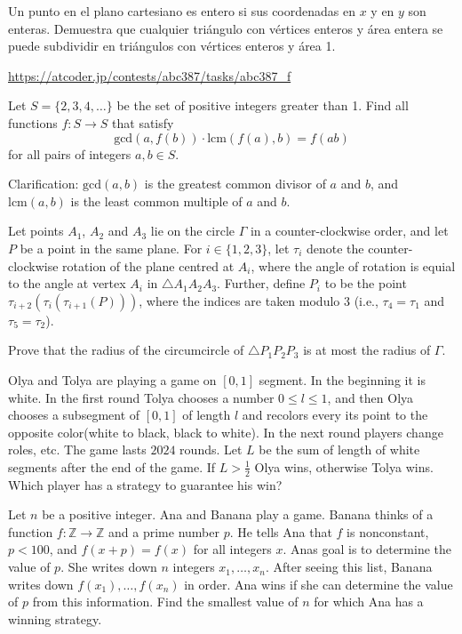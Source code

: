 \documentclass[11pt]{scrartcl}
\begin{document}
\begin{problem}
Un punto en el plano cartesiano es entero si sus coordenadas en $x$ y en $y$ son enteras. Demuestra que
cualquier tri\'angulo con v\'ertices enteros y \'area entera se puede subdividir en tri\'angulos con v\'ertices enteros y \'area 1.

\end{problem}
\begin{problem}[AC ABC387F]
\url{https://atcoder.jp/contests/abc387/tasks/abc387_f}
\end{problem}
\begin{problem}[Rioplatense 2024/3.5]
    Let $S = \{2, 3, 4, \dots\}$ be the set of positive integers greater than 1. Find all functions $f : S \to S$ that satisfy
\[
\text{gcd}(a, f(b)) \cdot \text{lcm}(f(a), b) = f(ab)
\]for all pairs of integers $a, b \in S$.

Clarification: $\text{gcd}(a,b)$ is the greatest common divisor of $a$ and $b$, and $\text{lcm}(a,b)$ is the least common multiple of $a$ and $b$.
\end{problem}
\begin{problem}[India 2024/5]
Let points $A_1$, $A_2$ and $A_3$ lie on the circle $\Gamma$ in a counter-clockwise order, and let $P$ be a point in the same plane. For $i \in \{1,2,3\}$, let $\tau_i$ denote the counter-clockwise rotation of the plane centred at $A_i$, where the angle of rotation is equial to the angle at vertex $A_i$ in $\triangle A_1A_2A_3$. Further, define $P_i$ to be the point $\tau_{i+2}(\tau_{i}(\tau_{i+1}(P)))$, where the indices are taken modulo $3$ (i.e., $\tau_4 = \tau_1$ and $\tau_5 = \tau_2$).

Prove that the radius of the circumcircle of $\triangle P_1P_2P_3$ is at most the radius of $\Gamma$.
\end{problem}
\begin{problem}
Olya and Tolya are playing a game on $[0,1]$ segment. In the beginning it is white. In the first round Tolya chooses a number $0 \leq l \leq 1$, and then Olya chooses a subsegment of $[0,1]$ of length $l$ and recolors every its point to the opposite color(white to black, black to white). In the next round players change roles, etc. The game lasts $2024$ rounds. Let $L$ be the sum of length of white segments after the end of the game. If $L > \frac{1}{2}$ Olya wins, otherwise Tolya wins. Which player has a strategy to guarantee his win?
\end{problem}
\begin{problem}
Let $n$ be a positive integer. Ana and Banana play a game. Banana thinks of a function $f\colon\mathbb{Z}\to\mathbb{Z}$ and a prime number $p$. He tells Ana that $f$ is nonconstant, $p<100$, and $f(x+p)=f(x)$ for all integers $x$. Anas goal is to determine the value of $p$. She writes down $n$ integers $x_1,\dots,x_n$. After seeing this list, Banana writes down $f(x_1),\dots,f(x_n)$ in order. Ana wins if she can determine the value of $p$ from this information. Find the smallest value of $n$ for which Ana has a winning strategy.
\end{problem}
\end{document}
